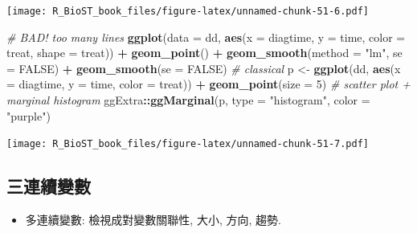\documentclass[
]{book}
\newenvironment{Shaded}{\begin{snugshade}}{\end{snugshade}}
\newcommand{\CommentTok}[1]{\textcolor[rgb]{0.56,0.35,0.01}{\textit{#1}}}
\newcommand{\DataTypeTok}[1]{\textcolor[rgb]{0.13,0.29,0.53}{#1}}
\newcommand{\DecValTok}[1]{\textcolor[rgb]{0.00,0.00,0.81}{#1}}
\newcommand{\KeywordTok}[1]{\textcolor[rgb]{0.13,0.29,0.53}{\textbf{#1}}}
\newcommand{\NormalTok}[1]{#1}
\newcommand{\OperatorTok}[1]{\textcolor[rgb]{0.81,0.36,0.00}{\textbf{#1}}}
\newcommand{\OtherTok}[1]{\textcolor[rgb]{0.56,0.35,0.01}{#1}}
\newcommand{\StringTok}[1]{\textcolor[rgb]{0.31,0.60,0.02}{#1}}
\providecommand{\tightlist}{%
  \setlength{\itemsep}{0pt}\setlength{\parskip}{0pt}}
\begin{document}
\texttt{[image: R\_BioST\_book\_files/figure-latex/unnamed-chunk-51-6.pdf]}

\begin{Shaded}
\begin{Highlighting}[]
\CommentTok{\# BAD! too many lines}
\KeywordTok{ggplot}\NormalTok{(}\DataTypeTok{data =}\NormalTok{ dd, }\KeywordTok{aes}\NormalTok{(}\DataTypeTok{x =}\NormalTok{ diagtime, }\DataTypeTok{y =}\NormalTok{ time,}
                      \DataTypeTok{color =}\NormalTok{ treat, }\DataTypeTok{shape =}\NormalTok{ treat)) }\OperatorTok{+}\StringTok{ }
\StringTok{  }\KeywordTok{geom\_point}\NormalTok{() }\OperatorTok{+}\StringTok{ }
\StringTok{  }\KeywordTok{geom\_smooth}\NormalTok{(}\DataTypeTok{method =} \StringTok{"lm"}\NormalTok{, }\DataTypeTok{se =} \OtherTok{FALSE}\NormalTok{) }\OperatorTok{+}\StringTok{ }
\StringTok{  }\KeywordTok{geom\_smooth}\NormalTok{(}\DataTypeTok{se =} \OtherTok{FALSE}\NormalTok{)}
\CommentTok{\# classical}
\NormalTok{p \textless{}{-}}\StringTok{ }\KeywordTok{ggplot}\NormalTok{(dd, }\KeywordTok{aes}\NormalTok{(}\DataTypeTok{x =}\NormalTok{ diagtime, }\DataTypeTok{y =}\NormalTok{ time, }\DataTypeTok{color =}\NormalTok{ treat)) }\OperatorTok{+}
\StringTok{      }\KeywordTok{geom\_point}\NormalTok{(}\DataTypeTok{size =} \DecValTok{5}\NormalTok{) }
\CommentTok{\# scatter plot + marginal histogram}
\NormalTok{ggExtra}\OperatorTok{::}\KeywordTok{ggMarginal}\NormalTok{(p, }\DataTypeTok{type =} \StringTok{"histogram"}\NormalTok{, }\DataTypeTok{color =} \StringTok{"purple"}\NormalTok{)}
\end{Highlighting}
\end{Shaded}

\texttt{[image: R\_BioST\_book\_files/figure-latex/unnamed-chunk-51-7.pdf]}

\hypertarget{ux4e09ux9023ux7e8cux8b8aux6578}{%
\subsection{三連續變數}\label{ux4e09ux9023ux7e8cux8b8aux6578}}

\begin{itemize}
\tightlist
\item
  多連續變數: 檢視成對變數關聯性, 大小, 方向, 趨勢.
\end{itemize}
\end{document}
